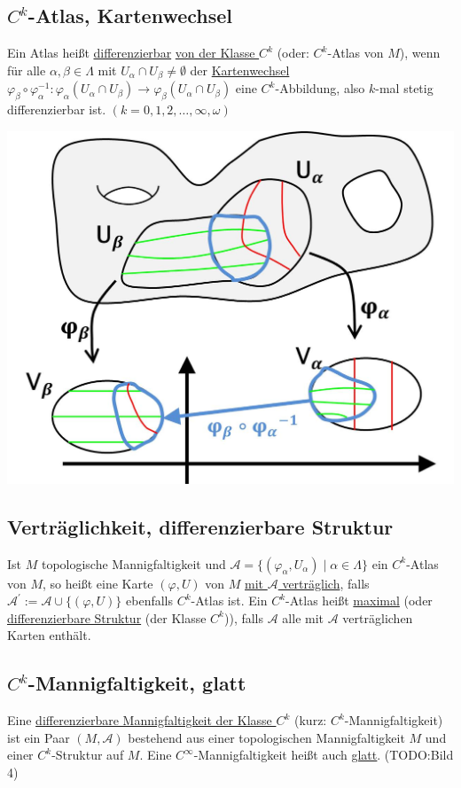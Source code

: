 \documentclass[a4paper,11pt,notitlepage]{report}
\newenvironment{Kasten}[1]
{
\hspace{0.05\linewidth}
\begin{center}
\begin{minipage}{0.9\linewidth}
\setlength{\fboxsep}{10pt}
\definecolor{shadecolor}{gray}{1}
\definecolor{framecolor}{gray}{0}
\def\FrameCommand{\fcolorbox{framecolor}{shadecolor}}
\MakeFramed {\FrameRestore}
\subsection{#1}
\begin{itshape}
}
{
\end{itshape}
\endMakeFramed
\end{minipage}
\end{center}
}
\begin{document}
\begin{Kasten}{$C^k$-Atlas, Kartenwechsel}
	Ein Atlas heißt \underline{differenzierbar} \underline{von der Klasse $C^k$} (oder: $C^k$-Atlas von $M$), wenn für alle $\alpha, \beta \in \Lambda$ mit $U_\alpha \cap U_\beta \neq \emptyset$ der \underline{Kartenwechsel} $\varphi_\beta \circ \varphi_\alpha^{-1} \colon \varphi_\alpha(U_\alpha \cap U_\beta) \rightarrow \varphi_\beta(U_\alpha \cap U_\beta)$ eine $C^k$-Abbildung, also $k$-mal stetig differenzierbar ist. $(k=0,1,2,\ldots,\infty,\omega)$
	\newline
\end{Kasten}
\includegraphics[scale=0.4]{images/Kartenwechsel.jpg}
 
\begin{Kasten}{Verträglichkeit, differenzierbare Struktur}
	Ist $M$ topologische Mannigfaltigkeit und $\mathcal{A}=\{(\varphi_\alpha,U_\alpha) \mid \alpha \in \Lambda\}$ ein $C^k$-Atlas von $M$, so heißt eine Karte $(\varphi,U)$ von $M$ \underline{mit $\mathcal{A}$ verträglich}, falls $\mathcal{A}^\prime := \mathcal{A} \cup \{(\varphi,U)\}$ ebenfalls $C^k$-Atlas ist. 
	Ein $C^k$-Atlas heißt \underline{maximal} (oder \underline{differenzierbare Struktur} (der Klasse $C^k$)), falls $\mathcal{A}$ alle mit $\mathcal{A}$ verträglichen Karten enthält.
\end{Kasten} 

\begin{Kasten}{$C^k$-Mannigfaltigkeit, glatt}
	Eine \underline{differenzierbare Mannigfaltigkeit der Klasse $C^k$} (kurz: $C^k$-Mannigfaltigkeit) ist ein Paar $(M,\mathcal{A})$ bestehend aus einer topologischen Mannigfaltigkeit $M$ und einer $C^k$-Struktur auf $M$. Eine $C^\infty$-Mannigfaltigkeit heißt auch \underline{\underline{glatt}}.
	\newline
	(TODO:Bild 4)
\end{Kasten}
\end{document}
